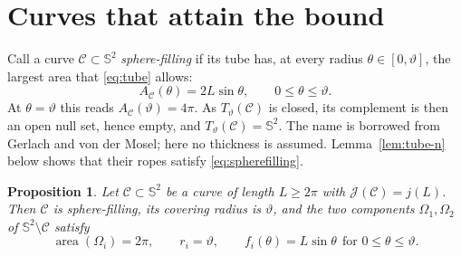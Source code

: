 \documentclass[11pt,oneside,reqno]{amsart}
\theoremstyle{plain}
\newtheorem{proposition}[theorem]{Proposition}
\theoremstyle{definition}
\DeclareMathOperator{\area}{area}
\newcommand{\Sph}{\mathbb{S}^{2}}
\begin{document}
\section{Curves that attain the bound}\label{sec:equality}

Call a curve $\mathcal{C}\subset\Sph$ \emph{sphere-filling} if its tube has, at
every radius $\theta\in[0,\vartheta]$, the largest area that \eqref{eq:tube}
allows:
\begin{equation}\label{eq:spherefilling}
  A_{\mathcal{C}}(\theta)=2L\sin\theta,
  \qquad 0\le\theta\le\vartheta .
\end{equation}
At $\theta=\vartheta$ this reads $A_{\mathcal{C}}(\vartheta)=4\pi$. As
$T_{\vartheta}(\mathcal{C})$
is closed, its complement is then an open null set, hence empty, and
$T_{\vartheta}(\mathcal{C})=\Sph$. The name is borrowed from Gerlach and von der
Mosel; here no thickness is assumed. Lemma~\ref{lem:tube-n} below shows that
their ropes satisfy \eqref{eq:spherefilling}.

\begin{proposition}\label{prop:equality}
Let $\mathcal{C}\subset\Sph$ be a curve of length $L\ge2\pi$ with
$\mathcal{J}(\mathcal{C})=j(L)$. Then $\mathcal{C}$ is
sphere-filling, its covering radius is $\vartheta$, and the two components
$\Omega_{1},\Omega_{2}$ of $\Sph\setminus\mathcal{C}$ satisfy
\begin{equation}
  \area(\Omega_{i})=2\pi,\qquad r_{i}=\vartheta,\qquad
  f_{i}(\theta)=L\sin\theta\ \ \text{for }0\le\theta\le\vartheta .
\end{equation}
\end{proposition}
\end{document}
